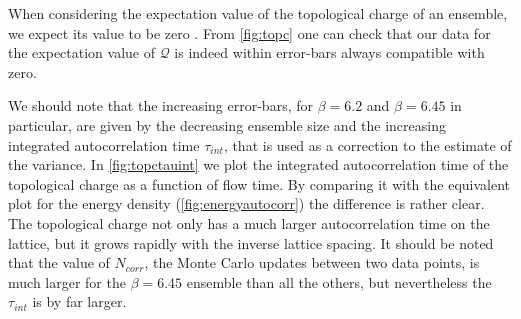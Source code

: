 When considering the expectation value of the topological charge of an ensemble, we expect its value to be zero \cite{ce_non-gaussianities_2015}. From \cref{fig:topc} one can check that our data for the expectation value of $\mathcal{Q}$ is indeed within error-bars always compatible with zero. 

We should note that the increasing error-bars, for $\beta = 6.2$ and $\beta = 6.45$ in particular, are given by the decreasing ensemble size and the increasing integrated autocorrelation time $\tau_{int}$, that is used as a correction to the estimate of the variance. In \cref{fig:topctauint} we plot the integrated autocorrelation time of the topological charge as a function of flow time. By comparing it with the equivalent plot for the energy density (\cref{fig:energyautocorr}) the difference is rather clear. The topological charge not only has a much larger autocorrelation time on the lattice, but it grows rapidly with the inverse lattice spacing. It should be noted that the value of $N_{corr}$, the Monte Carlo updates between two data points, is much larger for the $\beta=6.45$ ensemble than all the others, but nevertheless the $\tau_{int}$ is by far larger.

